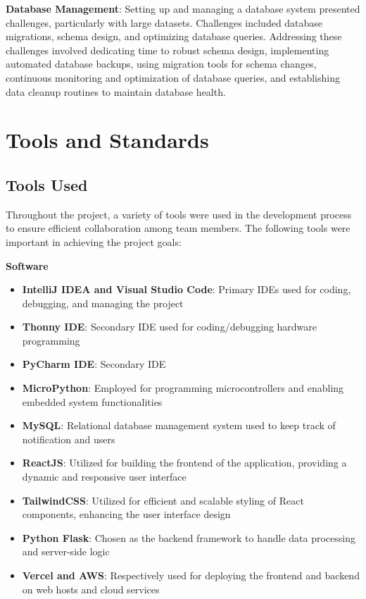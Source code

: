 \documentclass[conference]{IEEEtran}
\begin{document}
\textbf{Database Management}: Setting up and managing a database system presented challenges,
particularly with large datasets. Challenges included database migrations,
schema design, and optimizing database queries. Addressing these challenges involved
dedicating time to robust schema design, implementing automated database backups, using
migration tools for schema changes, continuous monitoring and optimization of database
queries, and establishing data cleanup routines to maintain database health.

\section{Tools and Standards}

\subsection{Tools Used}
Throughout the project, a variety of tools were used in the development process to
ensure efficient collaboration among team members. The following tools were important
in achieving the project goals:

\textbf{Software}
\begin{itemize}
      \item \textbf{IntelliJ IDEA and Visual Studio Code}: Primary IDEs used for coding,
            debugging, and managing the project
      \item \textbf{Thonny IDE}: Secondary IDE used for coding/debugging hardware
            programming
      \item \textbf{PyCharm IDE}: Secondary IDE
      \item \textbf{MicroPython}: Employed for programming microcontrollers and enabling embedded system functionalities
      \item \textbf{MySQL}: Relational database management system used to keep track of notification and users
      \item \textbf{ReactJS}: Utilized for building the frontend of the application, providing a dynamic and responsive user interface
      \item \textbf{TailwindCSS}: Utilized for efficient and scalable styling of React components, enhancing the user interface design
      \item \textbf{Python Flask}: Chosen as the backend framework to handle data processing and server-side logic
      \item \textbf{Vercel and AWS}: Respectively used for deploying the frontend and backend on web hosts and cloud services
\end{itemize}
\end{document}
